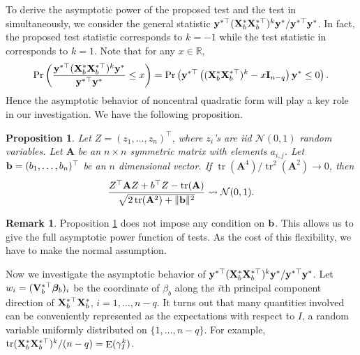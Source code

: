 \documentclass[11pt]{article}
\DeclareMathOperator{\mytr}{tr}
\DeclareMathOperator{\myE}{E}
\newcommand{\By}{\mathbf{y}}    \newcommand{\Bz}{\mathbf{z}}
\newcommand{\BA}{\mathbf{A}}    \newcommand{\BB}{\mathbf{B}}    \newcommand{\BC}{\mathbf{C}}    \newcommand{\BD}{\mathbf{D}}    \newcommand{\BE}{\mathbf{E}}    \newcommand{\BF}{\mathbf{F}}    \newcommand{\BG}{\mathbf{G}}    \newcommand{\BH}{\mathbf{H}}    \newcommand{\BI}{\mathbf{I}}    \newcommand{\BJ}{\mathbf{J}}    \newcommand{\BK}{\mathbf{K}}    \newcommand{\BL}{\mathbf{L}}
\newcommand{\bfsym}[1]{\ensuremath{\boldsymbol{#1}}}
\def\bbeta{\bfsym \beta}
\theoremstyle{plain}
\newtheorem{proposition}{\quad\quad Proposition}
\theoremstyle{definition}
\newtheorem{remark}{\quad\quad Remark}
\theoremstyle{remark}
\begin{document}
To derive the asymptotic power of the proposed test and the test in \cite{Goeman2006} simultaneously, we consider the general statistic
    ${
\By^{*\top}
    (\BX_b^* \BX_b^{*\top})^{k} 
        \By^*
    }/{\By^{*\top} \By^*}$.
    In fact, the proposed test statistic corresponds to $k=-1$ while the test statistic in \cite{Goeman2006} corresponds to $k=1$.
    Note that for any $x\in \mathbb R$,
    \begin{equation*}
        \Pr\left( 
    \frac{
\By^{*\top}
    (\BX_b^* \BX_b^{*\top})^{k} 
        \By^*
    }{\By^{*\top} \By^*}
    \leq x
        \right)
        =
        \Pr\left( 
\By^{*\top}
\left( 
    (\BX_b^* \BX_b^{*\top})^{k} 
    -x\BI_{n-q}
\right)
        \By^*
    \leq 
    0
\right).
    \end{equation*}
Hence the asymptotic behavior of noncentral quadratic form will play a key role in our investigation.
We have the following proposition.
\begin{proposition}
    Let $Z=(z_1,\ldots, z_n)^\top$, where $z_i$'s are iid $\mathcal N(0,1)$ random variables.
    Let $\BA$ be an $n\times n$ symmetric matrix with elements $a_{i,j}$.
    Let $\mathbf{b}=(b_1,\ldots, b_n)^\top$ be an $n$ dimensional vector.
    If $\mytr(\BA^4)/\mytr^2(\BA^2)\to 0$,
    then
    \begin{equation*}
        \frac{Z^\top \BA Z + b^\top Z - \mytr(\BA)}{\sqrt{2\mytr(\BA^2)+\|\Bb\|^2}}
        \rightsquigarrow \mathcal N(0,1).
    \end{equation*}
    \label{Lemma:normal}
\end{proposition}
\begin{remark}
    Proposition \ref{Lemma:normal} does not impose any condition on $\mathbf{b}$.
    This allows us to give the full asymptotic power function of tests.
    As the cost of this flexibility, we have to make the normal assumption.
\end{remark}


Now we investigate the asymptotic behavior of
    ${
\By^{*\top}
    (\BX_b^* \BX_b^{*\top})^{k} 
        \By^*
    }/{\By^{*\top} \By^*}$.
Let $w_i=(\BV_b^{*\top} \bbeta_b)_i$ be the coordinate of $\beta_b$ along the $i$th principal component direction of $\mathbf{X}_b^{*\top} \mathbf{X}_b^*$, $i=1,\ldots, n-q$.
It turns out that many quantities involved can be conveniently represented as the expectations with respect to $I$, a random variable uniformly distributed on $\{1,\ldots, n-q\}$.
For example, $
        {
            \mytr(\BX_b^* \BX_b^{*\top})^k
        }/
        (n-q )
        =\myE (\gamma_I^k)
$.
\end{document}
